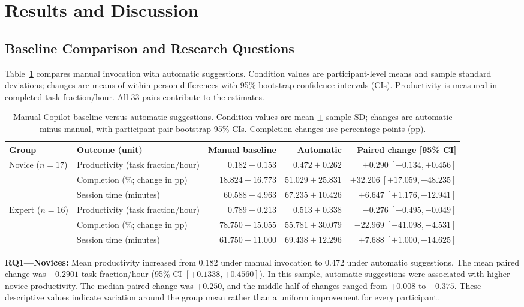 \section{Results and Discussion}
\label{sec:results}
\subsection{Baseline Comparison and Research Questions}
Table~\ref{tab:results} compares manual invocation with automatic suggestions.
Condition values are participant-level means and sample standard deviations;
changes are means of within-person differences with 95\% bootstrap confidence
intervals (CIs). Productivity is measured in completed task fraction/hour.
All 33 pairs contribute to the estimates.

\begin{table}[t]
\caption{Manual Copilot baseline versus automatic suggestions. Condition values are mean $\pm$ sample SD; changes are automatic minus manual, with participant-pair bootstrap 95\% CIs. Completion changes use percentage points (pp).}
\label{tab:results}
\centering
\begin{tabular}{@{}llrrr@{}}
\toprule
Group & Outcome (unit) & Manual baseline & Automatic & Paired change [95\% CI] \\
\midrule
Novice ($n=17$) & Productivity (task fraction/hour) & $0.182\pm0.153$ & $0.472\pm0.262$ & $+0.290\ [ +0.134, +0.456]$ \\
 & Completion (\%; change in pp) & $18.824\pm16.773$ & $51.029\pm25.831$ & $+32.206\ [ +17.059, +48.235]$ \\
 & Session time (minutes) & $60.588\pm4.963$ & $67.235\pm10.426$ & $+6.647\ [ +1.176, +12.941]$ \\
\midrule
Expert ($n=16$) & Productivity (task fraction/hour) & $0.789\pm0.213$ & $0.513\pm0.338$ & $-0.276\ [ -0.495, -0.049]$ \\
 & Completion (\%; change in pp) & $78.750\pm15.055$ & $55.781\pm30.079$ & $-22.969\ [ -41.098, -4.531]$ \\
 & Session time (minutes) & $61.750\pm11.000$ & $69.438\pm12.296$ & $+7.688\ [ +1.000, +14.625]$ \\
\bottomrule
\end{tabular}
\end{table}

\textbf{RQ1---Novices:} Mean productivity increased from 0.182 under manual
invocation to 0.472 under automatic suggestions. The mean paired change was
$+0.2901$ task fraction/hour (95\% CI $[+0.1338,+0.4560]$). In this sample,
automatic suggestions were associated with higher novice productivity.
The median paired change was $+0.250$, and the middle half of changes ranged
from $+0.008$ to $+0.375$. These descriptive values indicate variation around
the group mean rather than a uniform improvement for every participant.

